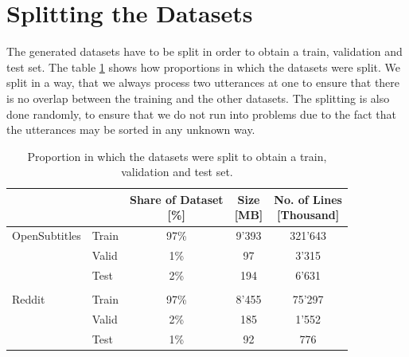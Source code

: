 \section{Splitting the Datasets}
\label{data:split_corpus}
The generated datasets have to be split in order to obtain a train, validation and test set. The table \ref{tbl:data:split:corpus} shows how proportions in which the datasets were split. We split in a way, that we always process two utterances at one to ensure that there is no overlap between the training and the other datasets. The splitting is also done randomly, to ensure that we do not run into problems due to the fact that the utterances may be sorted in any unknown way.
\\
\begin{table}[H]
	\centering
	\begin{adjustbox}{max width=\textwidth}
		\centering
		\small
		\begin{tabular}{llccc}
			\toprule
			&  \specialcell{Set}
			&  \specialcell{Share of Dataset \\ {[\%]}}
			&  \specialcell{Size \\{[MB]}}
			&  \specialcell{No. of Lines \\{[Thousand]}}\\
			\midrule
			OpenSubtitles	& Train	&97\%	&9'393	&321'643	\\
			&Valid	&1\%	&97		&3'315	\\
			&Test	&2\%	&194	&6'631	\\\\
			Reddit			&Train	&97\%	&8'455	&75'297	\\
			&Valid	&2\%	&185	&1'552	\\
			&Test	&1\%	&92		&776	\\
			\bottomrule
		\end{tabular}
	\end{adjustbox}
	\caption{Proportion in which the datasets were split to obtain a train, validation and test set.}
	\label{tbl:data:split:corpus}
\end{table}

